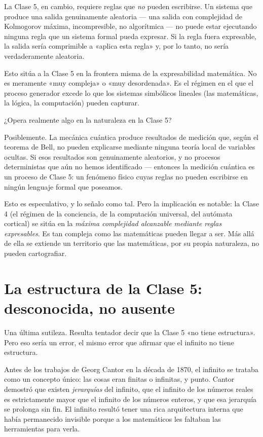 \documentclass[11pt, twoside, openright]{book}
\begin{document}
La Clase 5, en cambio, requiere reglas que \textit{no} pueden escribirse. Un sistema que produce una salida genuinamente aleatoria --- una salida con complejidad de Kolmogorov máxima, incompresible, no algorítmica --- no puede estar ejecutando ninguna regla que un sistema formal pueda expresar. Si la regla fuera expresable, la salida sería comprimible a «aplica esta regla» y, por lo tanto, no sería verdaderamente aleatoria.

Esto sitúa a la Clase 5 en la frontera misma de la expresabilidad matemática. No es meramente «muy compleja» o «muy desordenada». Es el régimen en el que el proceso generador excede lo que los sistemas simbólicos lineales (las matemáticas, la lógica, la computación) pueden capturar.

¿Opera realmente algo en la naturaleza en la Clase 5?

Posiblemente. La mecánica cuántica produce resultados de medición que, según el teorema de Bell, no pueden explicarse mediante ninguna teoría local de variables ocultas. Si esos resultados son genuinamente aleatorios, y no procesos deterministas que aún no hemos identificado --- entonces la medición cuántica es un proceso de Clase 5: un fenómeno físico cuyas reglas no pueden escribirse en ningún lenguaje formal que poseamos.

Esto es especulativo, y lo señalo como tal. Pero la implicación es notable: la Clase 4 (el régimen de la conciencia, de la computación universal, del autómata cortical) se sitúa en la \textit{máxima complejidad alcanzable mediante reglas expresables}. Es tan compleja como las matemáticas pueden llegar a ser. Más allá de ella se extiende un territorio que las matemáticas, por su propia naturaleza, no pueden cartografiar.

\section*{La estructura de la Clase 5: desconocida, no ausente}

Una última sutileza. Resulta tentador decir que la Clase 5 «no tiene estructura». Pero eso sería un error, el mismo error que afirmar que el infinito no tiene estructura.

Antes de los trabajos de Georg Cantor en la década de 1870, el infinito se trataba como un concepto único: las cosas eran finitas o infinitas, y punto. Cantor demostró que existen \textit{jerarquías} del infinito, que el infinito de los números reales es estrictamente mayor que el infinito de los números enteros, y que esa jerarquía se prolonga sin fin. El infinito resultó tener una rica arquitectura interna que había permanecido invisible porque a los matemáticos les faltaban las herramientas para verla.
\end{document}

